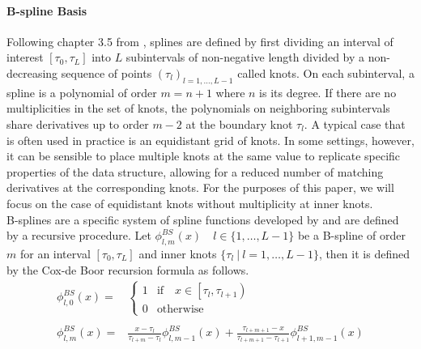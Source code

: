 \documentclass[11pt,twoside,a4paper]{article}
\begin{document}
	\paragraph{B-spline Basis} Following chapter 3.5 from \cite{ramsay_functional_2005}, splines are defined by first dividing an interval of interest $[\tau_0, \tau_L]$ into $L$ subintervals of non-negative length divided by a non-decreasing sequence of points $(\tau_l)_{l = 1,\dots, L-1}$ called knots. On each subinterval, a spline is a polynomial of order $m = n+1$ where $n$ is its degree. If there are no multiplicities in the set of knots, the polynomials on neighboring subintervals share derivatives up to order $m-2$ at the boundary knot $\tau_l$. A typical case that is often used in practice is an equidistant grid of knots. In some settings, however, it can be sensible to place multiple knots at the same value to replicate specific properties of the data structure, allowing for a reduced number of matching derivatives at the corresponding knots. For the purposes of this paper, we will focus on the case of equidistant knots without multiplicity at inner knots.\\
	
	B-splines are a specific system of spline functions developed by \cite{de_boor_practical_1978} and are defined by a recursive procedure. Let $\phi_{l,m}^{BS}(x) \quad l \in \{1,\dots,L-1\}$ be a B-spline of order $m$ for an interval $[\tau_0, \tau_L]$ and inner knots $\{\tau_l \: \vert \: l = 1,\dots, L-1\}$, then it is defined by the Cox-de Boor recursion formula as follows. 
	\begin{equation}
		\begin{split}
			\phi_{l,0}^{BS}(x) = &
			\begin{cases}
				1 & \text{if} \quad x \in \left[\tau_l, \tau_{l+1}\right)\\
				0 & \text{otherwise}
			\end{cases}\\ \\
			\phi_{l,m}^{BS}(x) = &\frac{x - \tau_l}{\tau_{l+m} - \tau_l} \phi_{l,m-1}^{BS}(x) + \frac{\tau_{l+m+1} - x}{\tau_{l+m+1} - \tau_{l+1}} \phi_{l+1,m-1}^{BS}(x)
		\end{split}
	\end{equation}
	
\end{document}
